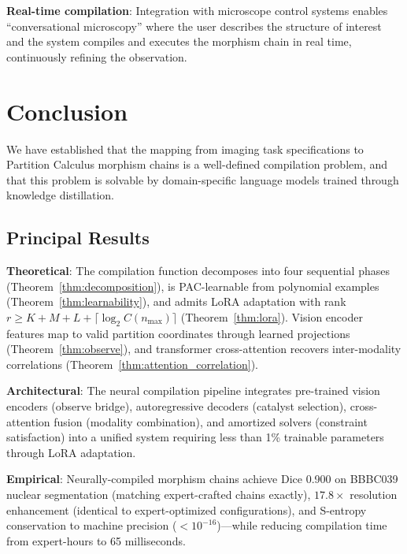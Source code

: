 \documentclass[11pt,twocolumn,a4paper]{article}
\theoremstyle{definition}
\theoremstyle{remark}
\begin{document}
\textbf{Real-time compilation}: Integration with microscope control systems enables ``conversational microscopy'' where the user describes the structure of interest and the system compiles and executes the morphism chain in real time, continuously refining the observation.

\section{Conclusion}
\label{sec:conclusion}

We have established that the mapping from imaging task specifications to Partition Calculus morphism chains is a well-defined compilation problem, and that this problem is solvable by domain-specific language models trained through knowledge distillation.

\subsection{Principal Results}

\textbf{Theoretical}: The compilation function decomposes into four sequential phases (Theorem~\ref{thm:decomposition}), is PAC-learnable from polynomial examples (Theorem~\ref{thm:learnability}), and admits LoRA adaptation with rank $r \geq K + M + L + \lceil \log_2 C(n_{\max}) \rceil$ (Theorem~\ref{thm:lora}). Vision encoder features map to valid partition coordinates through learned projections (Theorem~\ref{thm:observe}), and transformer cross-attention recovers inter-modality correlations (Theorem~\ref{thm:attention_correlation}).

\textbf{Architectural}: The neural compilation pipeline integrates pre-trained vision encoders (observe bridge), autoregressive decoders (catalyst selection), cross-attention fusion (modality combination), and amortized solvers (constraint satisfaction) into a unified system requiring less than 1\% trainable parameters through LoRA adaptation.

\textbf{Empirical}: Neurally-compiled morphism chains achieve Dice 0.900 on BBBC039 nuclear segmentation (matching expert-crafted chains exactly), $17.8\times$ resolution enhancement (identical to expert-optimized configurations), and S-entropy conservation to machine precision ($< 10^{-16}$)---while reducing compilation time from expert-hours to 65 milliseconds.
\end{document}

